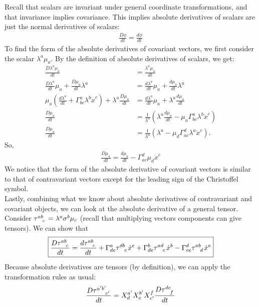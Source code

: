 \documentclass{article}
\theoremstyle{definition}
\begin{document}
Recall that scalars are invariant under general coordinate transformations, and that invariance implies covariance. This implies absolute derivatives of scalars are just the normal derivatives of scalars:
\begin{align*}
\boxed{\frac{D\phi}{dt} = \frac{d\phi}{dt}}
\end{align*}
To find the form of the absolute derivatives of covariant vectors, we first consider the scalar $\lambda^a\mu_a$. By the definition of absolute derivatives of scalars, we get:
\begin{align*}
\frac{D\lambda^a\mu_a}{dt} &= \frac{\lambda^a\mu_a}{dt}\\
\frac{D\lambda^a}{dt}\mu_a + \frac{D\mu_a}{dt}\lambda^a &= \frac{d\lambda^a}{dt}\mu_a + \frac{d\mu_a}{dt}\lambda^a\\
\mu_a\left( \frac{d\lambda^a}{dt}+\Gamma^a_{bc}\lambda^b\dot{x}^c\right)
+ \lambda^a\frac{D\mu_a}{dt} &= \frac{d\lambda^a}{dt}\mu_a + \lambda^a\frac{d\mu_a}{dt}\\
\frac{D\mu_a}{dt} &= \frac{1}{\lambda^a}\left(\lambda^a\frac{d\mu_a}{dt} - \mu_a\Gamma^a_{bc}\lambda^b\dot{x}^c \right)\\
\frac{D\mu_a}{dt} &= \frac{1}{\lambda^a}\left( \lambda^a - \mu_d\Gamma^d_{ac}\lambda^a\dot{x}^c\right).  
\end{align*}
So,
\begin{align}
\boxed{\frac{D\mu_a}{dt} = \frac{d\mu_a}{dt} - \Gamma^d_{ac}\mu_d\dot{x}^c}
\end{align}
We notice that the form of the absolute derivative of covariant vectors is similar to that of contravariant vectors except for the leading sign of the Christoffel symbol.\\

Lastly, combining what we know about absolute derivatives of contravariant and covariant objects,  we can look at the absolute derivative of a general tensor. Consider $\tensor{\tau}{^{ab}_{c}} = \lambda^a\sigma^b\mu_c$ (recall that multiplying vectors components can give tensors). We can show that
\begin{align*}
\boxed{\frac{D\tensor{\tau}{^{ab}_c}}{dt} = \frac{d\tensor{\tau}{^{ab}_{c}}}{dt} + \Gamma^{a}_{de}\tensor{\tau}{^{db}_{c}}\dot{x}^e + \Gamma^{b}_{de}\tensor{\tau}{^{ad}_{c}}\dot{x}^b - \Gamma^d_{ce}\tensor{\tau}{^{ab}_{d}}\dot{x}^e}
\end{align*} 
Because absolute derivatives are tensors (by definition), we can apply the transformation rules as usual:
\begin{align*}
\frac{D\tensor{\tau}{^{a'b'}_{c'}}}{dt} = X^{a'}_{d}X^{b'}_{e}X^{f}_{c'}\frac{D\tensor{\tau}{^{de}_{f}}}{dt}
\end{align*}
\end{document}
